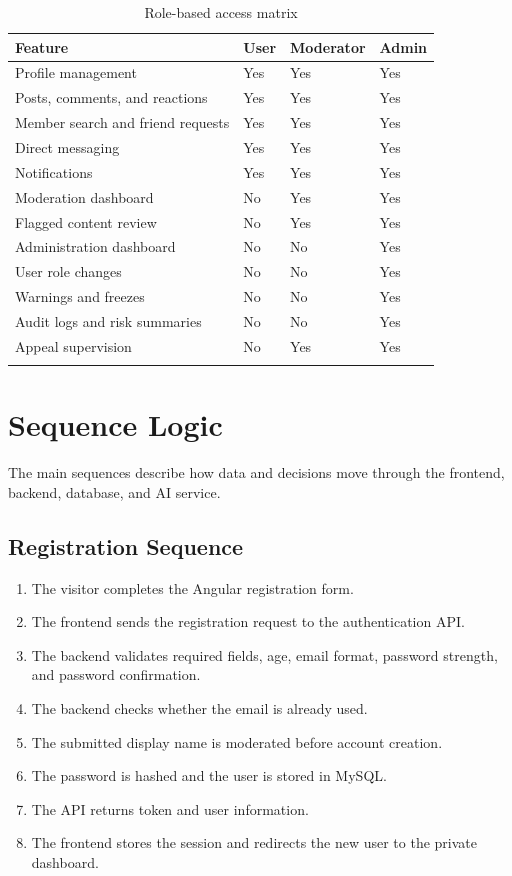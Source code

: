 \begin{longtable}{|m{5cm}|m{2.6cm}|m{2.6cm}|m{2.6cm}|}
\hline
\textbf{Feature} & \textbf{User} & \textbf{Moderator} & \textbf{Admin} \\
\hline
Profile management & Yes & Yes & Yes \\
\hline
Posts, comments, and reactions & Yes & Yes & Yes \\
\hline
Member search and friend requests & Yes & Yes & Yes \\
\hline
Direct messaging & Yes & Yes & Yes \\
\hline
Notifications & Yes & Yes & Yes \\
\hline
Moderation dashboard & No & Yes & Yes \\
\hline
Flagged content review & No & Yes & Yes \\
\hline
Administration dashboard & No & No & Yes \\
\hline
User role changes & No & No & Yes \\
\hline
Warnings and freezes & No & No & Yes \\
\hline
Audit logs and risk summaries & No & No & Yes \\
\hline
Appeal supervision & No & Yes & Yes \\
\hline
\caption{Role-based access matrix}
\end{longtable}

\section{Sequence Logic}

The main sequences describe how data and decisions move through the frontend, backend, database, and AI service.

\subsection{Registration Sequence}

\begin{enumerate}
    \item The visitor completes the Angular registration form.
    \item The frontend sends the registration request to the authentication API.
    \item The backend validates required fields, age, email format, password strength, and password confirmation.
    \item The backend checks whether the email is already used.
    \item The submitted display name is moderated before account creation.
    \item The password is hashed and the user is stored in MySQL.
    \item The API returns token and user information.
    \item The frontend stores the session and redirects the new user to the private dashboard.
\end{enumerate}

